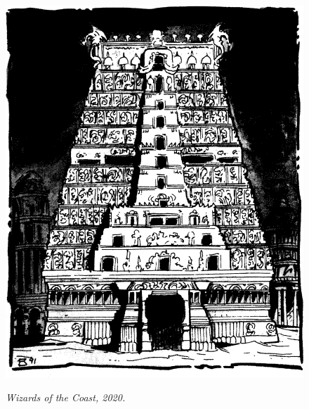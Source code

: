 \begin{figure}[b!]
\centering
\includegraphics[width=\columnwidth]{images/tyr-1.png}
\par\textit{\small\textcopyright Wizards of the Coast, 2020.}
\end{figure}

